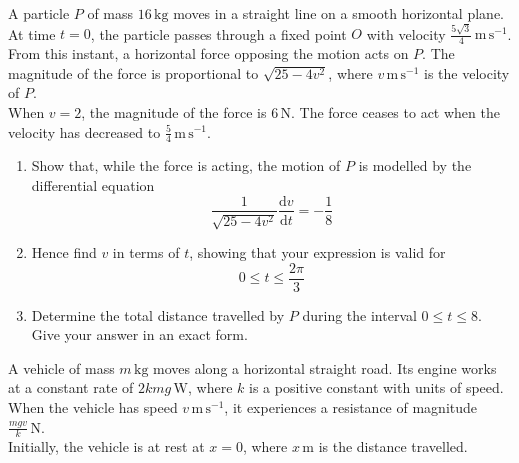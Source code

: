 \documentclass[leqno]{article}
\begin{document}
\begin{enumerate}[
  label=\textbf{\arabic*.},
  leftmargin=*,
  topsep=0pt,
  partopsep=0pt,
  parsep=0pt
]
\newpage

\questionitem

A particle $P$ of mass $16\,\mathrm{kg}$ moves in a straight line on a smooth horizontal plane. \\ 

At time $t=0$, the particle passes through a fixed point $O$ with velocity $\frac{5\sqrt{3}}{4}\,\mathrm{m\,s^{-1}}$. \\

From this instant, a horizontal force opposing the motion acts on $P$. The magnitude of the force is proportional to $\sqrt{25-4v^2}$, where $v\,\mathrm{m\,s^{-1}}$ is the velocity of $P$.  \\

When $v=2$, the magnitude of the force is $6\,\mathrm{N}$. The force ceases to act when the velocity has decreased to $\frac{5}{4}\,\mathrm{m\,s^{-1}}$. \\

\begin{enumerate}[label=\textbf{(\alph*)}]
  \item Show that, while the force is acting, the motion of $P$ is modelled by the differential equation
  \[
  \frac{1}{\sqrt{25-4v^2}}\frac{\mathrm{d}v}{\mathrm{d}t}=-\frac{1}{8}
  \]
  \item Hence find $v$ in terms of $t$, showing that your expression is valid for
  \[
  0\leq t\leq \frac{2\pi}{3}
  \]
  \item Determine the total distance travelled by $P$ during the interval $0\leq t\leq 8$. Give your answer in an exact form.  \\
\end{enumerate}

\newpage

\questionitem

A vehicle of mass $m\,\mathrm{kg}$ moves along a horizontal straight road. Its engine works at a constant rate of $2kmg\,\mathrm{W}$, where $k$ is a positive constant with units of speed. When the vehicle has speed $v\,\mathrm{m\,s^{-1}}$, it experiences a resistance of magnitude $\frac{mgv}{k}\,\mathrm{N}$. \\

Initially, the vehicle is at rest at $x=0$, where $x\,\mathrm{m}$ is the distance travelled. \\


\end{enumerate}
\end{document}
